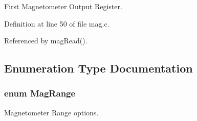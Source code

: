 First Magnetometer Output Register. 



Definition at line 50 of file mag.\-c.



Referenced by mag\-Read().



\subsection{Enumeration Type Documentation}
\hypertarget{group__mag_ga3af649d913d146d6654db2354d88c18a}{
\subsubsection[{Mag\-Range}]{\setlength{\rightskip}{0pt plus 5cm}enum {\bf Mag\-Range}}}\label{group__mag_ga3af649d913d146d6654db2354d88c18a}


Magnetometer Range options. 

